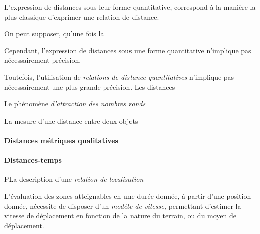 L'expression de distances sous leur forme quantitative, correspond à
la manière la plus classique d'exprimer une relation de distance.

On peut supposer, qu'une fois la

Cependant, l'expression de distances sous une forme quantitative
n'implique pas nécessairement précision. 

Toutefois, l'utilisation de \emph{relations de distance quantitatives}
n'implique pas nécessairement une plus grande précision. Les distances


Le phénomène \emph{d'attraction des nombres ronds}

La mesure d'une distance entre deux objets 



\paragraph{Distances métriques qualitatives}



\paragraph{Distances-temps}




PLa description d'une \emph{relation de localisation}

L'évaluation des zones atteignables en une durée donnée, à partir
d'une position donnée, nécessite de disposer d'un \emph{modèle de
  vitesse,} permettant d'estimer la vitesse de déplacement en fonction
de la nature du terrain, ou du moyen de déplacement.

